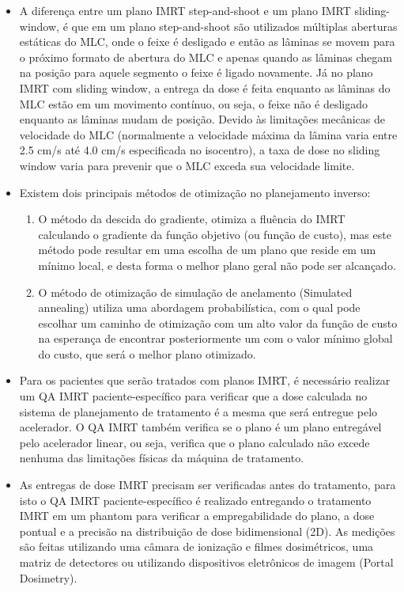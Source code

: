 \documentclass[11pt,a4paper]{article}
\newcounter{exemplo}
\begin{document}
\begin{exemplo}
\begin{itemize}
        \item A diferença entre um plano IMRT step-and-shoot e um plano IMRT sliding-window, é que em um plano step-and-shoot são utilizados múltiplas aberturas estáticas do MLC, onde o feixe é desligado e então as lâminas se movem para o próximo formato de abertura do MLC e apenas quando as lâminas chegam na posição para aquele segmento o feixe é ligado novamente. Já no plano IMRT com sliding window, a entrega da dose é feita enquanto as lâminas do MLC estão em um movimento contínuo, ou seja, o feixe não é desligado enquanto as lâminas mudam de posição. Devido às limitações mecânicas de velocidade do MLC (normalmente a velocidade máxima da lâmina varia entre 2.5 cm/s até 4.0 cm/s especificada no isocentro), a taxa de dose no sliding window varia para prevenir que o MLC exceda sua velocidade limite.
        
        \item Existem dois principais métodos de otimização no planejamento inverso:
        
            \begin{enumerate}
                \item O método da descida do gradiente, otimiza a fluência do IMRT calculando o gradiente da função objetivo (ou função de custo), mas este método pode resultar em uma escolha de um plano que reside em um mínimo local, e desta forma o melhor plano geral não pode ser alcançado.
                
                \item O método de otimização de simulação de anelamento (Simulated annealing) utiliza uma abordagem probabilística, com o qual pode escolhar um caminho de otimização com um alto valor da função de custo na esperança de encontrar posteriormente um com o valor mínimo global do custo, que será o melhor plano otimizado.
            \end{enumerate}

        \item Para os pacientes que serão tratados com planos IMRT, é necessário realizar um QA IMRT paciente-específico para verificar que a dose calculada no sistema de planejamento de tratamento é a mesma que será entregue pelo acelerador. O QA IMRT também verifica se o plano é um plano entregável pelo acelerador linear, ou seja, verifica que o plano calculado não excede nenhuma das limitações físicas da máquina de tratamento.
        
        \item As entregas de dose IMRT precisam ser verificadas antes do tratamento, para isto o QA IMRT paciente-específico é realizado entregando o tratamento IMRT em um phantom para verificar a empregabilidade do plano, a dose pontual e a precisão na distribuição de dose bidimensional (2D). As medições são feitas utilizando uma câmara de ionização e filmes dosimétricos, uma matriz de detectores ou utilizando dispositivos eletrônicos de imagem (Portal Dosimetry).
        

\end{itemize}
\end{exemplo}
\end{document}
